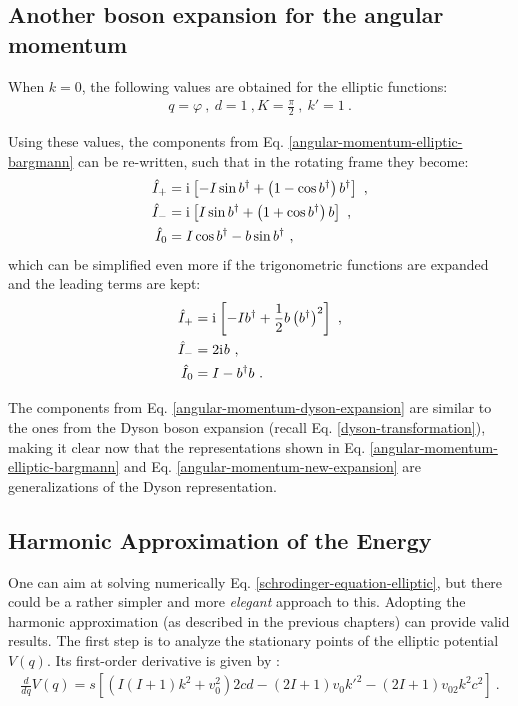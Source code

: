 \subsection{Another boson expansion for the angular momentum}

When $k=0$, the following values are obtained for the elliptic functions:
\begin{align}
    q=\varphi\ ,\ d=1\ , K=\frac{\pi}{2}\ ,\ k'=1\ .
\end{align}

Using these values, the components from Eq. \ref{angular-momentum-elliptic-bargmann} can be re-written, such that in the rotating frame they become:
\begin{align}
    \hat{I}_+&=\mathrm{i}\mkern1mu\left[-I\sin b^\dagger+\left(1-\cos b^\dagger\right)b^\dagger\right]\ ,\nonumber\\
    \hat{I}_-&=\mathrm{i}\mkern1mu\left[I\sin b^\dagger+\left(1+\cos b^\dagger\right)b\right]\ ,\nonumber\\
    \hat{I}_0&=I\cos b^\dagger-b\sin b^\dagger\ ,
    \label{angular-momentum-new-expansion}
\end{align}
which can be simplified even more if the trigonometric functions are expanded and the leading terms are kept:
\begin{align}
    \hat{I}_+&=\iu\left[-Ib^\dagger+\frac{1}{2}b\left(b^\dagger\right)^2\right]\ ,\nonumber\\
    \hat{I}_-&=2\iu b\ ,\nonumber\\
    \hat{I}_0&=I-b^\dagger b\ .
    \label{angular-momentum-dyson-expansion}
\end{align}

The components from Eq. \ref{angular-momentum-dyson-expansion} are similar to the ones from the Dyson boson expansion (recall Eq. \ref{dyson-transformation}), making it clear now that the representations shown in Eq. \ref{angular-momentum-elliptic-bargmann} and Eq. \ref{angular-momentum-new-expansion} are generalizations of the Dyson representation.

\subsection{Harmonic Approximation of the Energy}

One can aim at solving numerically Eq. \ref{schrodinger-equation-elliptic}, but there could be a rather simpler and more \emph{elegant} approach to this. Adopting the harmonic approximation (as described in the previous chapters) can provide valid results. The first step is to analyze the stationary points of the elliptic potential $V(q)$. Its first-order derivative is given by \cite{raduta2020new}:
\begin{align}
    \frac{d}{dq}V(q)=s\left[\left(I(I+1)k^2+v_0^2\right)2cd-(2I+1)v_0k'^2-(2I+1)v_02k^2c^2\right]\ .
\end{align}

